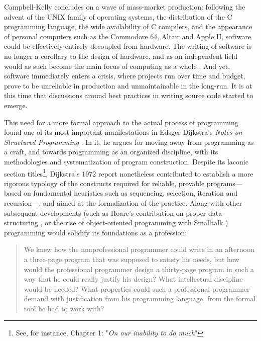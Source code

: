 Campbell-Kelly concludes on a wave of mass-market production: following the advent of the UNIX family of operating systems, the distribution of the C programming language, the wide availability of C compilers, and the appearance of personal computers such as the Commodore 64, Altair and Apple II, software could be effectively entirely decoupled from hardware. The writing of software is no longer a corollary to the design of hardware, and as an independent field would as such become the main focus of computing as a whole \citep{ceruzzi_history_2003}. And yet, software immediately enters a crisis, where projects run over time and budget, prove to be unreliable in production and unmaintainable in the long-run. It is at this time that discussions around best practices in writing source code started to emerge.

This need for a more formal approach to the actual process of programming found one of its most important manifestations in Edsger Dijkstra's \emph{Notes on Structured Programming} \citep{dijkstra_chapter_1972}. In it, he argues for moving away from programming as a craft, and towards programming as an organized discipline, with its methodologies and systematization of program construction. Despite its laconic section titles\footnote{See, for instance, Chapter 1: "\emph{On our inability to do much}"}, Dijkstra's 1972 report nonetheless contributed to establish a more rigorous typology of the constructs required for reliable, provable programs—based on fundamental heuristics such as sequencing, selection, iteration and recursion—, and aimed at the formalization of the practice. Along with other subsequent developments (such as Hoare's contribution on proper data structuring \citep{hoare_chapter_1972}, or the rise of object-oriented programming with Smalltalk \citep{kay_early_1993}) programming would solidify its foundations as a profession:

\begin{quote}
  We knew how the nonprofessional programmer could write in an afternoon a three-page program that was supposed to satisfy his needs, but how would the professional programmer design a thirty-page program in such a way that he could really justify his design? What intellectual discipline would be needed? What properties could such a professional programmer demand with justification from his programming language, from the formal tool he had to work with?  \citep{dijkstra_chapter_1972}
\end{quote}


